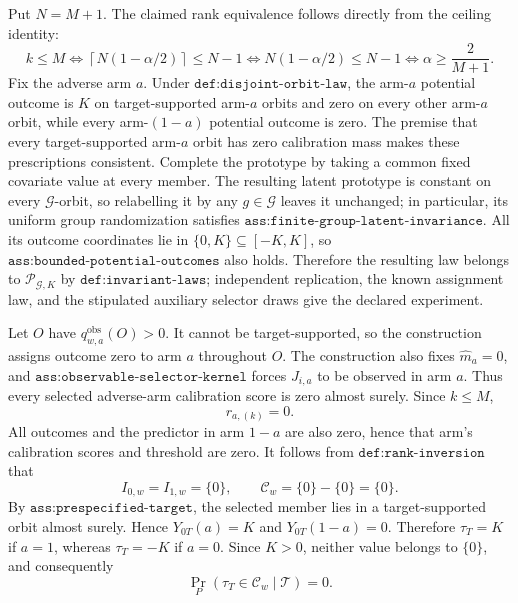 Put \(N=M+1\). The claimed rank equivalence follows directly from the ceiling identity: 
\[k\le M\iff \left\lceil N(1-\alpha/2)\right\rceil\le N-1\iff N(1-\alpha/2)\le N-1\iff \alpha\ge\frac{2}{M+1}.\]
Fix the adverse arm \(a\). Under \(\texttt{def:disjoint-orbit-law}\), the arm-\(a\) potential outcome is \(K\) on target-supported arm-\(a\) orbits and zero on every other arm-\(a\) orbit, while every arm-\((1-a)\) potential outcome is zero. The premise that every target-supported arm-\(a\) orbit has zero calibration mass makes these prescriptions consistent. Complete the prototype by taking a common fixed covariate value at every member. The resulting latent prototype is constant on every \(\mathcal G\)-orbit, so relabelling it by any \(g\in\mathcal G\) leaves it unchanged; in particular, its uniform group randomization satisfies \(\texttt{ass:finite-group-latent-invariance}\). All its outcome coordinates lie in \(\{0,K\}\subseteq[-K,K]\), so \(\texttt{ass:bounded-potential-outcomes}\) also holds. Therefore the resulting law belongs to \(\mathcal P_{\mathcal G,K}\) by \(\texttt{def:invariant-laws}\); independent replication, the known assignment law, and the stipulated auxiliary selector draws give the declared experiment.

Let \(O\) have \(q^{\mathrm{obs}}_{w,a}(O)>0\). It cannot be target-supported, so the construction assigns outcome zero to arm \(a\) throughout \(O\). The construction also fixes \(\widehat m_a=0\), and \(\texttt{ass:observable-selector-kernel}\) forces \(J_{i,a}\) to be observed in arm \(a\). Thus every selected adverse-arm calibration score is zero almost surely. Since \(k\le M\),
\[r_{a,(k)}=0.\]
All outcomes and the predictor in arm \(1-a\) are also zero, hence that arm's calibration scores and threshold are zero. It follows from \(\texttt{def:rank-inversion}\) that
\[I_{0,w}=I_{1,w}=\{0\},\qquad \mathcal C_w=\{0\}-\{0\}=\{0\}.\]
By \(\texttt{ass:prespecified-target}\), the selected member lies in a target-supported orbit almost surely. Hence \(Y_{0T}(a)=K\) and \(Y_{0T}(1-a)=0\). Therefore \(\tau_T=K\) if \(a=1\), whereas \(\tau_T=-K\) if \(a=0\). Since \(K>0\), neither value belongs to \(\{0\}\), and consequently
\[\Pr_P(\tau_T\in\mathcal C_w\mid\mathcal T)=0.\]